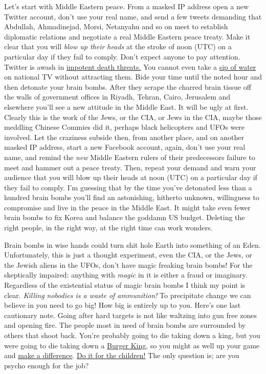 Let's start with Middle Eastern peace. From a masked IP address open a
new Twitter account, don't use your real name, and send a few tweets
demanding that Abdullah, Ahmadinejad, Morsi, Netanyahu and so on meet to
establish diplomatic relations and negotiate a real Middle Eastern peace
treaty. Make it clear that you will \emph{blow up their heads} at the
stroke of noon (UTC) on a particular day if they fail to comply. Don't
expect anyone to pay attention. Twitter is awash in
\href{http://www.nbcnews.com/technology/technolog/justin-bieber-army-fills-twitter-death-threats-again-125690}{impotent
death threats.} You cannot even take a
\href{http://www.myfoxdetroit.com/story/21141805/rubios-water-break}{sip
of water} on national TV without attracting them. Bide your time until
the noted hour and then detonate your brain bombs. After they scrape the
charred brain tissue off the walls of government offices in Riyadh,
Tehran, Cairo, Jerusalem and elsewhere you'll see a new attitude in the
Middle East. It will be ugly at first. Clearly this is the work of the
Jews, or the CIA, or Jews in the CIA, maybe those meddling Chinese
Commies did it, perhaps black helicopters and UFOs were involved. Let
the craziness subside then, from another place, and on another masked IP
address, start a new Facebook account, again, don't use your real name,
and remind the \emph{new} Middle Eastern rulers of their predecessors
failure to meet and hammer out a peace treaty. Then, repeat your demand
and warn your audience that you will blow up their heads at noon (UTC)
on a particular day if they fail to comply. I'm guessing that by the
time you've detonated less than a hundred brain bombs you'll find an
astonishing, hitherto unknown, willingness to compromise and live in the
peace in the Middle East. It might take even fewer brain bombs to fix
Korea and balance the goddamn US budget. Deleting the right people, in
the right way, at the right time can work wonders.

Brain bombs in wise hands could turn shit hole Earth into something of
an Eden. Unfortunately, this is just a thought experiment, even the CIA,
or the Jews, or the Jewish aliens in the UFOs, don't have magic freaking
brain bombs! For the skeptically impaired: anything with \emph{magic} in
it is either a fraud or imaginary. Regardless of the existential status
of magic brain bombs I think my point is clear. \emph{Killing nobodies
is a waste of ammunition!} To precipitate change we can believe in you
need to go big! How big is entirely up to you. Here's one last
cautionary note. Going after hard targets is not like waltzing into gun
free zones and opening fire. The people most in need of brain bombs are
surrounded by others that shoot back. You're probably going to die
taking down a king, but you were going to die taking down a
\href{http://forum.prisonplanet.com/index.php?topic=95261.0;wap2}{Burger
King}, so you might as well up your game and 
\href{http://www.aboundlessworld.com/why-most-movements-are-bullshit-and-how-to-actually-make-a-difference/}{make a difference}. 
\href{http://imgur.com/Ph5dE}{Do it for the children!} The only question 
is; are you psycho enough for the job?



%